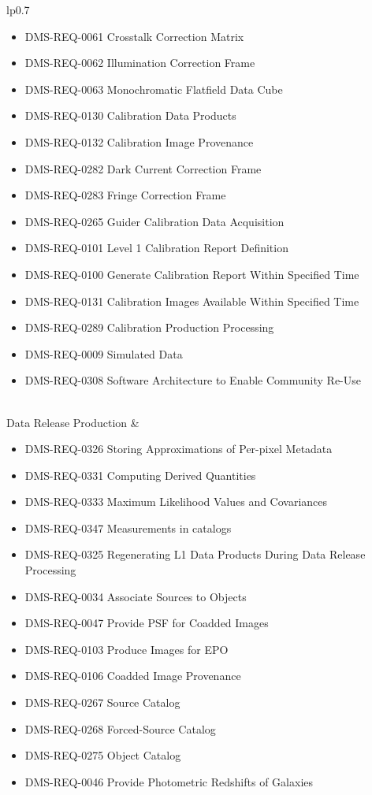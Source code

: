 \begin{xtabular}{lp{0.7\textwidth}}
\begin{itemize}
\item DMS-REQ-0061 Crosstalk Correction Matrix
\item DMS-REQ-0062 Illumination Correction Frame
\item DMS-REQ-0063 Monochromatic Flatfield Data Cube
\item DMS-REQ-0130 Calibration Data Products
\item DMS-REQ-0132 Calibration Image Provenance
\item DMS-REQ-0282 Dark Current Correction Frame
\item DMS-REQ-0283 Fringe Correction Frame
\item DMS-REQ-0265 Guider Calibration Data Acquisition
\item DMS-REQ-0101 Level 1 Calibration Report Definition
\item DMS-REQ-0100 Generate Calibration Report Within Specified Time
\item DMS-REQ-0131 Calibration Images Available Within Specified Time
\item DMS-REQ-0289 Calibration Production Processing
\item DMS-REQ-0009 Simulated Data
\item DMS-REQ-0308 Software Architecture to Enable Community Re-Use
\end{itemize} \\ \hline
Data Release Production &
\begin{itemize}
\item DMS-REQ-0326 Storing Approximations of Per-pixel Metadata
\item DMS-REQ-0331 Computing Derived Quantities
\item DMS-REQ-0333 Maximum Likelihood Values and Covariances
\item DMS-REQ-0347 Measurements in catalogs
\item DMS-REQ-0325 Regenerating L1 Data Products During Data Release Processing
\item DMS-REQ-0034 Associate Sources to Objects
\item DMS-REQ-0047 Provide PSF for Coadded Images
\item DMS-REQ-0103 Produce Images for EPO
\item DMS-REQ-0106 Coadded Image Provenance
\item DMS-REQ-0267 Source Catalog
\item DMS-REQ-0268 Forced-Source Catalog
\item DMS-REQ-0275 Object Catalog
\item DMS-REQ-0046 Provide Photometric Redshifts of Galaxies

\end{itemize}
\end{xtabular}
